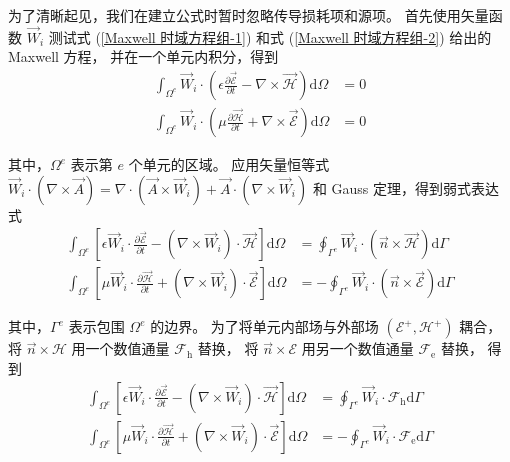 \par 为了清晰起见，我们在建立公式时暂时忽略传导损耗项和源项。
首先使用矢量函数 $\vec{W}_i$ 测试式 (\ref{Maxwell 时域方程组-1}) 
和式 (\ref{Maxwell 时域方程组-2}) 给出的 Maxwell 方程，
并在一个单元内积分，得到
\begin{align}
    \int_{\Omega^e}\vec{W}_i\cdot\left(
        \epsilon\frac{\partial\vec{\mathscr{E}}}{\partial t}
        -\nabla\times\vec{\mathscr{H}}
    \right)\text{d}\Omega&=0\\
    \int_{\Omega^e}\vec{W}_i\cdot\left(
        \mu\frac{\partial\vec{\mathscr{H}}}{\partial t}
        +\nabla\times\vec{\mathscr{E}}
    \right)\text{d}\Omega&=0
\end{align}
\par 其中，$\Omega^e$ 表示第 $e$ 个单元的区域。
应用矢量恒等式
$\vec{W}_i\cdot(\nabla\times \vec{A})
=\nabla\cdot(\vec{A}\times\vec{W}_i)+\vec{A}\cdot(\nabla\times\vec{W}_i)$
和 Gauss 定理，得到弱式表达式
\begin{align}
    \int_{\Omega^e}\left[
        \epsilon\vec{W}_i\cdot\frac{\partial\vec{\mathscr{E}}}{\partial t}
        -(\nabla\times\vec{W}_i)\cdot\vec{\mathscr{H}}
    \right]\text{d}\Omega
    &=\oint_{\Gamma^e}\vec{W}_i\cdot(\vec{n}\times\vec{\mathscr{H}})\text{d}\Gamma\\
    \int_{\Omega^e}\left[
        \mu\vec{W}_i\cdot\frac{\partial\vec{\mathscr{H}}}{\partial t}
        +(\nabla\times\vec{W}_i)\cdot\vec{\mathscr{E}}
    \right]\text{d}\Omega
    &=-\oint_{\Gamma^e}\vec{W}_i\cdot(\vec{n}\times\vec{\mathscr{E}})\text{d}\Gamma
\end{align}
\par 其中，$\Gamma^e$ 表示包围 $\Omega^e$ 的边界。
为了将单元内部场与外部场 $(\mathscr{E}^+, \mathscr{H}^+)$ 耦合，将
$\vec{n}\times\mathscr{H}$ 用一个数值通量 $\mathscr{F}_{\text{h}}$ 替换，
将 $\vec{n}\times\mathscr{E}$ 用另一个数值通量 $\mathscr{F}_{\text{e}}$ 替换，
得到
\begin{align}
    \int_{\Omega^e}\left[
        \epsilon\vec{W}_i\cdot\frac{\partial\vec{\mathscr{E}}}{\partial t}
        -(\nabla\times\vec{W}_i)\cdot\vec{\mathscr{H}}
    \right]\text{d}\Omega
    &=\oint_{\Gamma^e}\vec{W}_i\cdot\mathscr{F}_{\text{h}}\text{d}\Gamma\\
    \int_{\Omega^e}\left[
        \mu\vec{W}_i\cdot\frac{\partial\vec{\mathscr{H}}}{\partial t}
        +(\nabla\times\vec{W}_i)\cdot\vec{\mathscr{E}}
    \right]\text{d}\Omega
    &=-\oint_{\Gamma^e}\vec{W}_i\cdot\mathscr{F}_{\text{e}}\text{d}\Gamma
\end{align}
